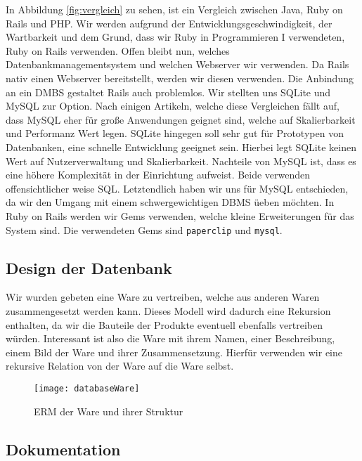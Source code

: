 In Abbildung \ref{fig:vergleich} zu sehen, ist ein Vergleich zwischen Java, Ruby on Rails und PHP. Wir werden aufgrund der Entwicklungsgeschwindigkeit, der Wartbarkeit und dem Grund, dass wir Ruby in Programmieren I verwendeten, Ruby on Rails verwenden. Offen bleibt nun, welches Datenbankmanagementsystem und welchen Webserver wir verwenden. Da Rails nativ einen Webserver bereitstellt, werden wir diesen verwenden. Die Anbindung an ein DMBS gestaltet Rails auch problemlos. Wir stellten uns SQLite und MySQL zur Option. Nach einigen Artikeln, welche diese Vergleichen f\"allt auf, dass MySQL eher f\"ur gro{\ss}e Anwendungen geignet sind, welche auf Skalierbarkeit und Performanz Wert legen. SQLite hingegen soll sehr gut f\"ur Prototypen von Datenbanken, eine schnelle Entwicklung geeignet sein. Hierbei legt SQLite keinen Wert auf Nutzerverwaltung und Skalierbarkeit. Nachteile von MySQL ist, dass es eine h\"ohere Komplexit\"at in der Einrichtung aufweist. Beide verwenden offensichtlicher weise SQL. Letztendlich haben wir uns f\"ur MySQL entschieden, da wir den Umgang mit einem schwergewichtigen DBMS \"ueben m\"ochten. In Ruby on Rails werden wir Gems verwenden, welche kleine Erweiterungen f\"ur das System sind. Die verwendeten Gems sind \texttt{paperclip} und \texttt{mysql}.

\subsection{Design der Datenbank}
\label{sec:dbdesign}
Wir wurden gebeten eine Ware zu vertreiben, welche aus anderen Waren zusammengesetzt werden kann. Dieses Modell wird dadurch eine Rekursion enthalten, da wir die Bauteile der Produkte eventuell ebenfalls vertreiben w\"urden. Interessant ist also die Ware mit ihrem Namen, einer Beschreibung, einem Bild der Ware und ihrer Zusammensetzung. Hierf\"ur verwenden wir eine rekursive Relation von der Ware auf die Ware selbst.  

\begin{wrapfigure}{R}{0.5\textwidth}
  	\begin{center}
    	\texttt{[image: databaseWare]}
 	 \end{center}
   \caption{ERM der Ware und ihrer Struktur}
\end{wrapfigure}

\subsection{Dokumentation}

